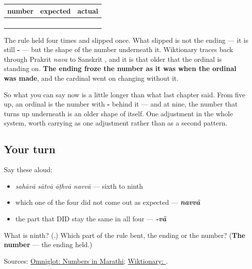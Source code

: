 \begin{grammarlens}[title={Grammar Lens: one tooth missing, and where it went}]
\noindent
\begin{tabularx}{\linewidth}{@{}>{\raggedright\arraybackslash}X>{\raggedright\arraybackslash}X>{\raggedright\arraybackslash}X@{}}
\toprule
\textbf{number} & \textbf{expected} & \textbf{actual} \\
\midrule
\textbf{\mr{सहा}} & \textbf{\mr{सहावा}} & \textbf{\mr{सहावा}} \\
\textbf{\mr{सात}} & \textbf{\mr{सातवा}} & \textbf{\mr{सातवा}} \\
\textbf{\mr{आठ}} & \textbf{\mr{आठवा}} & \textbf{\mr{आठवा}} \\
\textbf{\mr{नऊ}} & \textbf{\mr{नऊवा}} & \textbf{\mr{नववा}} \\
\bottomrule
\end{tabularx}

The rule held four times and slipped once. What slipped is not the ending — it is still \textbf{-} — but the shape of the number underneath it. Wiktionary traces \textbf{} back through Prakrit \emph{nava} to Sanskrit \textbf{}, and it is that older \textbf{} that the ordinal is standing on. \textbf{The ending froze the number as it was when the ordinal was made}, and the cardinal went on changing without it.

So what you can say now is a little longer than what last chapter said. From five up, an ordinal is the number with \textbf{-} behind it — and at nine, the number that turns up underneath is an older shape of itself. One adjustment in the whole system, worth carrying as one adjustment rather than as a second pattern.
\end{grammarlens}

\subsection*{Your turn}
Say these aloud:

\begin{itemize}
\raggedright
  \item \emph{sahāvā sātvā āṭhvā navvā} — sixth to ninth
  \item which one of the four did not come out as expected — \emph{\textbf{navvā}}
  \item the part that DID stay the same in all four — \emph{\textbf{-vā}}
\end{itemize}

\begin{tcolorbox}[breakable,colback=teal!4,colframe=teal!35!black,title={Before you move on}]
What is ninth? (\textbf{}.) Which part of the rule bent, the ending or the number? (\textbf{The number} — the ending held.)

Sources: \href{https://www.omniglot.com/language/numbers/marathi.htm}{Omniglot: Numbers in Marathi}; \href{https://en.wiktionary.org/wiki/\%E0\%A4\%A8\%E0\%A4\%8A}{Wiktionary: }.
\end{tcolorbox}

